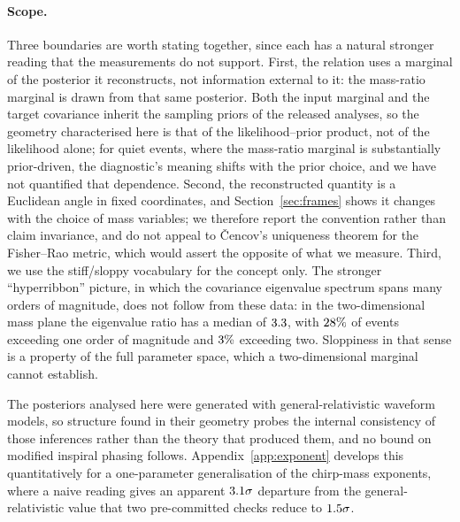 \documentclass[aps,preprint,amsmath,amssymb,nofootinbib,superscriptaddress]{revtex4-2}
\begin{document}
\paragraph{Scope.} Three boundaries are worth stating together, since each has a natural stronger reading
that the measurements do not support. First, the relation uses a marginal of the posterior it
reconstructs, not information external to it: the mass-ratio marginal is drawn from that same posterior.
Both the input marginal and the target covariance inherit the sampling priors of the released analyses, so
the geometry characterised here is that of the likelihood--prior product, not of the likelihood alone; for
quiet events, where the mass-ratio marginal is substantially prior-driven, the diagnostic's meaning shifts
with the prior choice, and we have not quantified that dependence.
Second, the reconstructed quantity is a Euclidean angle in fixed coordinates, and Section~\ref{sec:frames}
shows it changes with the choice of mass variables; we therefore report the convention rather than claim
invariance, and do not appeal to {\v C}encov's uniqueness theorem for the Fisher--Rao metric, which would
assert the opposite of what we measure. Third, we use the stiff/sloppy vocabulary
\citep{Transtrum2015} for the concept only. The stronger ``hyperribbon'' picture, in which the covariance
eigenvalue spectrum spans many orders of magnitude, does not follow from these data: in the
two-dimensional mass plane the eigenvalue ratio has a median of $3.3$, with $28\%$
of events exceeding one order of magnitude and $3\%$ exceeding two. Sloppiness in that sense is
a property of the full parameter space, which a two-dimensional marginal cannot establish.

The posteriors analysed here were generated with general-relativistic waveform models, so structure found
in their geometry probes the internal consistency of those inferences rather than the theory that produced
them, and no bound on modified inspiral phasing follows. Appendix~\ref{app:exponent} develops this
quantitatively for a one-parameter generalisation of the chirp-mass exponents, where a naive reading gives
an apparent $3.1\sigma$ departure from the general-relativistic value that two pre-committed
checks reduce to $1.5\sigma$.
\end{document}
